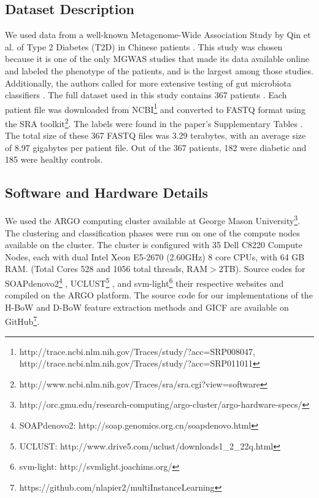 \subsection{Dataset Description}

We used data from a well-known Metagenome-Wide Association Study by Qin et al. of Type 2 Diabetes (T2D) in Chinese patients \cite{qin041012}. This study was chosen because it is one of the only MGWAS studies that made its data available online and labeled the phenotype of the patients, and is the largest among those studies. Additionally, the authors called for more extensive testing of gut microbiota classifiers \cite{qin041012}. The full dataset used in this study contains 367 patients \cite{qin041012}. Each patient file was downloaded from NCBI\footnote{http://trace.ncbi.nlm.nih.gov/Traces/study/?acc=SRP008047, http://trace.ncbi.nlm.nih.gov/Traces/study/?acc=SRP011011}
and converted to FASTQ format using the SRA toolkit\footnote{http://www.ncbi.nlm.nih.gov/Traces/sra/sra.cgi?view=software}.
The labels were found in the paper's Supplementary Tables \cite{qin041012}. The total size of these 367 FASTQ files was 3.29 terabytes, with an average size of 8.97 gigabytes per patient file. Out of the 367 patients, 182 were diabetic and 185 were healthy controls. 

\subsection{Software and Hardware Details}
We used the ARGO computing cluster available at George Mason University\footnote{http://orc.gmu.edu/research-computing/argo-cluster/argo-hardware-specs/}. The clustering and classification phases were run on one of the compute nodes available on the cluster. The cluster is configured with 35 Dell C8220 Compute Nodes, each with dual Intel Xeon E5-2670 (2.60GHz) 8 core CPUs, with 64 GB RAM. (Total Cores 528 and 1056 total threads, RAM$>$2TB). Source codes for 
SOAPdenovo2\footnote{SOAPdenovo2: http://soap.genomics.org.cn/soapdenovo.html} \cite{luo12}, UCLUST\footnote{UCLUST: http://www.drive5.com/uclust/downloads1\_{}2\_{}22q.html}    \cite{Edgar10}, and svm-light\footnote{svm-light: http://svmlight.joachims.org/} \cite{joachims08}
their respective websites and compiled on the ARGO platform. The source code for our implementations of the H-BoW and D-BoW feature extraction methods and GICF are available on GitHub\footnote{https://github.com/nlapier2/multiInstanceLearning}.

